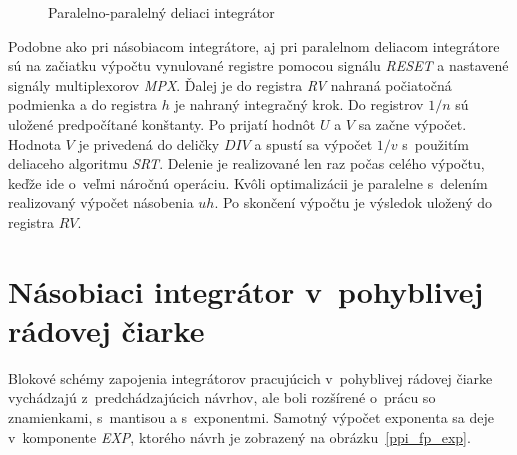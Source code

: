 \begin{figure}[h]
\centering
{}
\caption{Paralelno-paralelný deliaci integrátor \cite{MatecnyBP}}
\label{ppdi}
\end{figure}
\bigskip

\newpage
Podobne ako pri násobiacom integrátore, aj pri paralelnom deliacom integrátore sú na začiatku výpočtu vynulované registre pomocou signálu \textit{RESET} a nastavené signály multiplexorov \textit{MPX}. Ďalej je do registra \textit{RV} nahraná počiatočná podmienka a do registra $ h $ je nahraný integračný krok. Do registrov $ 1/n $ sú uložené predpočítané konštanty. Po prijatí hodnôt $ U $ a $ V $ sa začne výpočet. Hodnota $ V $ je privedená do deličky $ DIV $ a spustí sa výpočet $ 1/v $ s~použitím deliaceho algoritmu \textit{SRT}. Delenie je realizované len raz počas celého výpočtu, keďže ide o~veľmi náročnú operáciu. Kvôli optimalizácii je paralelne s~delením realizovaný výpočet násobenia $ uh $.
Po skončení výpočtu je výsledok uložený do registra $ RV $. 

\newpage
\section{Násobiaci integrátor v~pohyblivej rádovej čiarke}
Blokové schémy zapojenia integrátorov pracujúcich v~pohyblivej rádovej čiarke vychádzajú z~predchádzajúcich návrhov, ale boli rozšírené o~prácu so znamienkami, s~mantisou a s~exponentmi. Samotný výpočet exponenta sa deje v~komponente \textit{EXP}, ktorého návrh je zobrazený na obrázku~\ref{ppi_fp_exp}.

